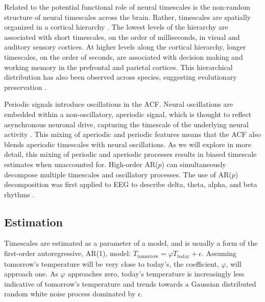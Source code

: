 \documentclass[pdflatex,sn-mathphys-num]{sn-jnl}
\begin{document}
Related to the potential functional role of neural timescales is the non-random structure of neural timescales across the brain. Rather, timescales are spatially organized in a cortical hierarchy \cite{hasson_hierarchy_2008, kiebel_hierarchy_2008, murray_hierarchy_2014, gao_neuronal_2020, misic_brain_2010, raut_organization_2020}. The lowest levels of the hierarchy are associated with short timescales, on the order of milliseconds, in visual \cite{buracas_efficient_1998} and auditory \cite{yang_millisecond-scale_2008} sensory cortices. At higher levels along the cortical hierarchy, longer timescales, on the order of seconds, are associated with decision making \cite{brody_timing_2003} and working memory \cite{wang_probabilistic_2002} in the prefrontal and parietal cortices. This hierarchical distribution has also been observed across species, suggesting evolutionary preservation \cite{buzsaki_scaling_2013}.

Periodic signals introduce oscillations in the ACF. Neural oscillations are embedded within a non-oscillatory, aperiodic signal, which is thought to reflect asynchronous neuronal drive, capturing the timescale of the underlying neural activity \cite{gao_neuronal_2020}. This mixing of aperiodic and periodic features means that the ACF also blends aperiodic timescales with neural oscillations. As we will explore in more detail, this mixing of periodic and aperiodic processes results in biased timescale estimates when unaccounted for. High-order AR($p$) can simultaneously decompose multiple timescales and oscillatory processes. The use of AR($p$) decomposition was first applied to EEG to describe delta, theta, alpha, and beta rhythms \cite{Sato1977}.

\subsection{Estimation}\label{sec:estimation}

Timescales are estimated as a parameter of a model, and is usually a form of the first-order autoregressive, AR(1), model: $T_{\text{tomorrow}} = \varphi T_{\text{today}} + \epsilon$. Assuming tomorrow's temperature will be very close to today's, the coefficient, $\varphi$, will approach one. As $\varphi$ approaches zero, today's temperature is increasingly less indicative of tomorrow's temperature and trends towards a Gaussian distributed random white noise process dominated by $\epsilon$.
\end{document}
